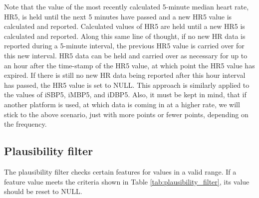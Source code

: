 \documentclass[
   technote
]{phildoc}
\newcommand{\tab}{Table}
\begin{document}
Note that the value of the most recently calculated 5-minute median heart rate, HR5, is held until the next 5 minutes have passed and a new HR5 value is calculated and reported.   Calculated values of HR5 are held until a new HR5 is calculated and reported.  Along this same line of thought, if no new HR data is reported during a 5-minute interval, the previous HR5 value is carried over for this new interval.  HR5 data can be held and carried over as necessary for up to an hour after the time-stamp of the HR5 value, at which point the HR5 value has expired.  If there is still no new HR data being reported after this hour interval has passed, the HR5 value is set to NULL. This approach is similarly applied to the values of iSBP5, iMBP5, and iDBP5. Also, it must be kept in mind, that if another platform is used, at which data is coming in at a higher rate, we will stick to the above scenario, just with more points or fewer points, depending on the frequency.

\subsection{Plausibility filter}
The plausibility filter checks certain features for values in a valid range. If a feature value meets the criteria shown in \tab{} \ref{tab:plausibility_filter}, its value should be reset to NULL. 
\end{document}

